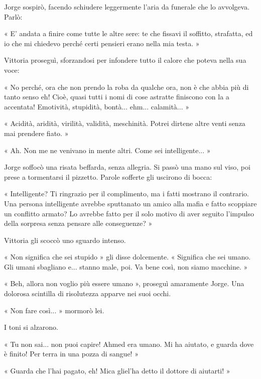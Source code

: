 Jorge sospirò, facendo schiudere leggermente l'aria da funerale che lo avvolgeva. Parlò:

« E' andata a finire come tutte le altre sere: te che fissavi il soffitto, strafatta, ed io che mi chiedevo perché certi pensieri erano nella mia testa. »

Vittoria proseguì, sforzandosi per infondere tutto il calore che poteva nella sua voce:

« No perché, ora che non prendo la roba da qualche ora, non è che abbia più di tanto senso eh! Cioè, quasi tutti i nomi di cose astratte finiscono con la a accentata! Emotività, stupidità, bontà... ehm... calamità... »

« Acidità, aridità, virilità, validità, meschinità. Potrei dirtene altre venti senza mai prendere fiato. »

« Ah. Non me ne venivano in mente altri. Come sei intelligente... »

Jorge soffocò una risata beffarda, senza allegria. Si passò una mano sul viso, poi prese a tormentarsi il pizzetto. Parole sofferte gli uscirono di bocca:

« Intelligente? Ti ringrazio per il complimento, ma i fatti mostrano il contrario. Una persona intelligente avrebbe sputtanato un amico alla mafia e fatto scoppiare un conflitto armato? Lo avrebbe fatto per il solo motivo di aver seguito l'impulso della sorpresa senza pensare alle conseguenze? »

Vittoria gli scoccò uno sguardo intenso.

« Non significa che sei stupido » gli disse dolcemente. « Significa che sei umano. Gli umani sbagliano e... stanno male, poi. Va bene così, non siamo macchine. »

« Beh, allora non voglio più essere umano », proseguì amaramente Jorge. Una dolorosa scintilla di risolutezza apparve nei suoi occhi.

« Non fare così... » mormorò lei.

I toni si alzarono.

« Tu non sai... non puoi capire! Ahmed era umano. Mi ha aiutato, e guarda dove è finito! Per terra in una pozza di sangue! »

« Guarda che l'hai pagato, eh! Mica gliel'ha detto il dottore di aiutarti! »


